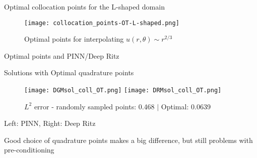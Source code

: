 \documentclass{beamer}
\begin{document}
















\begin{frame}{Optimal collocation points  for the L-shaped domain}
 \begin{figure}
  \texttt{[image: collocation\_points-OT-L-shaped.png]}
   \caption{Optimal points for interpolating {\color{red} $u(r,\theta) \sim r^{2/3}$}}
  \end{figure}

\end{frame}






\begin{frame}{Optimal points and PINN/Deep Ritz}
    
    Solutions with Optimal quadrature points 

\begin{figure}
\centering
    \texttt{[image: DGMsol\_coll\_OT.png]}
    \texttt{[image: DRMsol\_coll\_OT.png]}
    \caption{$L^{2}$ error - randomly sampled points: 0.468 $|$ Optimal: {\color{blue} 0.0639}}
    \label{fig:DRM_comparison}
\end{figure}

Left: PINN, Right: Deep Ritz
\begin{center}
    {\color {purple} Good choice of quadrature points makes a big difference, but still problems with pre-conditioning}
\end{center}
\end{frame}
\end{document}
